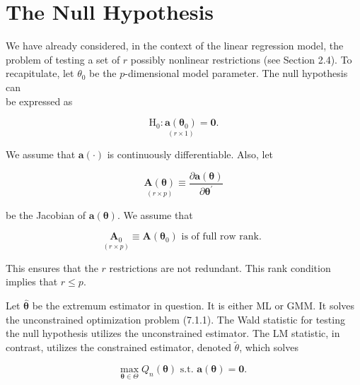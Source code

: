 \documentclass[10pt]{article}
\begin{document}
\section*{The Null Hypothesis}
We have already considered, in the context of the linear regression model, the problem of testing a set of $r$ possibly nonlinear restrictions (see Section 2.4). To recapitulate, let $\theta_{0}$ be the $p$-dimensional model parameter. The null hypothesis can\\
be expressed as


\begin{equation*}
\mathrm{H}_{0}: \underset{(r \times 1)}{\mathbf{a}\left(\boldsymbol{\theta}_{0}\right)}=\mathbf{0} . \tag{7.4.1}
\end{equation*}


We assume that $\mathbf{a}(\cdot)$ is continuously differentiable. Also, let


\begin{equation*}
\underset{(r \times p)}{\mathbf{A}(\boldsymbol{\theta})} \equiv \frac{\partial \mathbf{a}(\boldsymbol{\theta})}{\partial \boldsymbol{\theta}^{\prime}} \tag{7.4.2}
\end{equation*}


be the Jacobian of $\mathbf{a}(\boldsymbol{\theta})$. We assume that


\begin{equation*}
\underset{(r \times p)}{\mathbf{A}_{0}} \equiv \mathbf{A}\left(\boldsymbol{\theta}_{0}\right) \text { is of full row rank. } \tag{7.4.3}
\end{equation*}


This ensures that the $r$ restrictions are not redundant. This rank condition implies that $r \leq p$.

Let $\hat{\boldsymbol{\theta}}$ be the extremum estimator in question. It is either ML or GMM. It solves the unconstrained optimization problem (7.1.1). The Wald statistic for testing the null hypothesis utilizes the unconstrained estimator. The LM statistic, in contrast, utilizes the constrained estimator, denoted $\tilde{\theta}$, which solves


\begin{equation*}
\max _{\boldsymbol{\theta} \in \Theta} Q_{n}(\boldsymbol{\theta}) \text { s.t. } \mathbf{a}(\boldsymbol{\theta})=\mathbf{0} \text {. } \tag{7.4.4}
\end{equation*}
\end{document}
